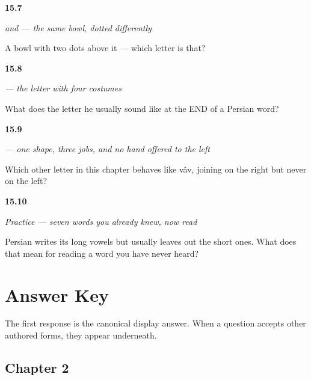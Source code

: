 \noindent\begin{minipage}[t]{\linewidth}
\raggedright
\hypertarget{review-FA-W15-te-nun-dots}{\textbf{15.7}} \emph{ and  — the same bowl, dotted differently}\par
\small A bowl with two dots above it — which letter is that?
\end{minipage}\par\medskip

\noindent\begin{minipage}[t]{\linewidth}
\raggedright
\hypertarget{review-FA-W15-he-final}{\textbf{15.8}} \emph{ — the letter with four costumes}\par
\small What does the letter he usually sound like at the END of a Persian word?
\end{minipage}\par\medskip

\noindent\begin{minipage}[t]{\linewidth}
\raggedright
\hypertarget{review-FA-W15-vav-join}{\textbf{15.9}} \emph{ — one shape, three jobs, and no hand offered to the left}\par
\small Which other letter in this chapter behaves like vâv, joining on the right but never on the left?
\end{minipage}\par\medskip

\noindent\begin{minipage}[t]{\linewidth}
\raggedright
\hypertarget{review-FA-C15-practice-vowels}{\textbf{15.10}} \emph{Practice — seven words you already knew, now read}\par
\small Persian writes its long vowels but usually leaves out the short ones. What does that mean for reading a word you have never heard?
\end{minipage}\par\medskip

\chapter*{Answer Key}

The first response is the canonical display answer. When a question accepts other authored forms, they appear underneath.

\section*{Chapter 2}

